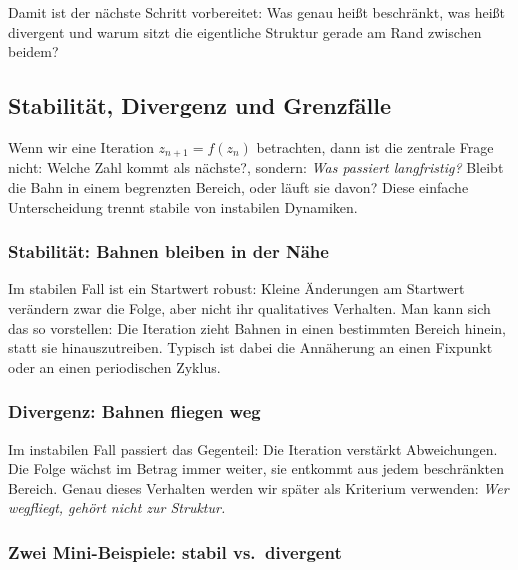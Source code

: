 Damit ist der nächste Schritt vorbereitet:
Was genau heißt \glqq beschränkt\grqq{},
was heißt \glqq divergent\grqq{}
und warum sitzt die eigentliche Struktur gerade am Rand zwischen beidem?


\subsection{Stabilität, Divergenz und Grenzfälle}


Wenn wir eine Iteration $z_{n+1}=f(z_n)$ betrachten, dann ist die zentrale Frage nicht:
\glqq Welche Zahl kommt als nächste?\grqq{},
sondern:
\emph{Was passiert langfristig?}
Bleibt die Bahn in einem begrenzten Bereich, oder läuft sie davon?
Diese einfache Unterscheidung trennt stabile von instabilen Dynamiken.

\subsubsection*{Stabilität: Bahnen bleiben in der Nähe}

Im stabilen Fall ist ein Startwert robust:
Kleine Änderungen am Startwert verändern zwar die Folge,
aber nicht ihr qualitatives Verhalten.
Man kann sich das so vorstellen:
Die Iteration zieht Bahnen in einen bestimmten Bereich hinein,
statt sie hinauszutreiben.
Typisch ist dabei die Annäherung an einen Fixpunkt oder an einen periodischen Zyklus.

\subsubsection*{Divergenz: Bahnen fliegen weg}

Im instabilen Fall passiert das Gegenteil:
Die Iteration verstärkt Abweichungen.
Die Folge wächst im Betrag immer weiter,
sie \glqq entkommt\grqq{} aus jedem beschränkten Bereich.
Genau dieses Verhalten werden wir später als Kriterium verwenden:
\emph{Wer wegfliegt, gehört nicht zur Struktur.}

\subsubsection*{Zwei Mini-Beispiele: stabil vs.\ divergent}

